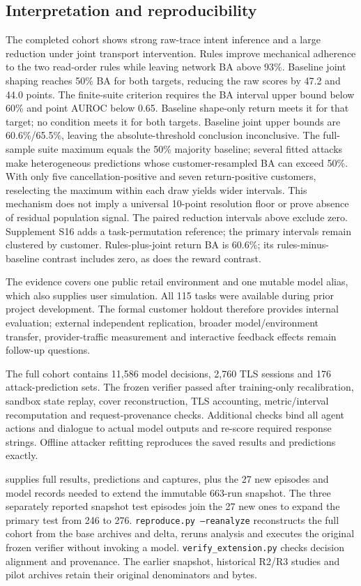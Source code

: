 \subsection{Interpretation and reproducibility}
The completed cohort shows strong raw-trace intent inference and a large reduction under joint transport intervention. Rules improve mechanical adherence to the two read-order rules while leaving network BA above 93\%. Baseline joint shaping reaches 50\% BA for both targets, reducing the raw scores by 47.2 and 44.0 points. The finite-suite criterion requires the BA interval upper bound below 60\% and point AUROC below 0.65. Baseline shape-only return meets it for that target; no condition meets it for both targets. Baseline joint upper bounds are 60.6\%/65.5\%, leaving the absolute-threshold conclusion inconclusive. The full-sample suite maximum equals the 50\% majority baseline; several fitted attacks make heterogeneous predictions whose customer-resampled BA can exceed 50\%. With only five cancellation-positive and seven return-positive customers, reselecting the maximum within each draw yields wider intervals. This mechanism does not imply a universal 10-point resolution floor or prove absence of residual population signal. The paired reduction intervals above exclude zero. Supplement S16 adds a task-permutation reference; the primary intervals remain clustered by customer. Rules-plus-joint return BA is 60.6\%; its rules-minus-baseline contrast includes zero, as does the reward contrast.

The evidence covers one public retail environment and one mutable model alias, which also supplies user simulation. All 115 tasks were available during prior project development. The formal customer holdout therefore provides internal evaluation; external independent replication, broader model/environment transfer, provider-traffic measurement and interactive feedback effects remain follow-up questions.

The full cohort contains 11,586 model decisions, 2,760 TLS sessions and 176 attack-prediction sets. The frozen verifier passed after training-only recalibration, sandbox state replay, cover reconstruction, TLS accounting, metric/interval recomputation and request-provenance checks. Additional checks bind all agent actions and dialogue to actual model outputs and re-score required response strings. Offline attacker refitting reproduces the saved results and predictions exactly.

 supplies full results, predictions and captures, plus the 27 new episodes and model records needed to extend the immutable 663-run snapshot. The three separately reported snapshot test episodes join the 27 new ones to expand the primary test from 246 to 276. \texttt{reproduce.py --reanalyze} reconstructs the full cohort from the base archives and delta, reruns analysis and executes the original frozen verifier without invoking a model. \texttt{verify\_extension.py} checks decision alignment and provenance. The earlier snapshot, historical R2/R3 studies and pilot archives retain their original denominators and bytes.
